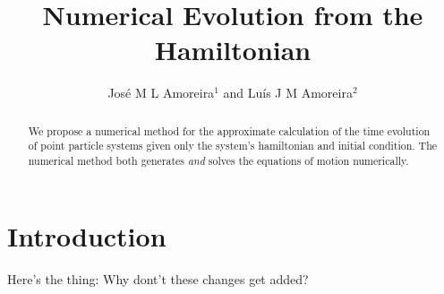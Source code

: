 \documentclass{iopart}
\begin{document}
\title{Numerical Evolution from the Hamiltonian}
\author{José M L Amoreira$^1$ and Luís J M Amoreira$^2$}
\address{$^1$ Departamento de Física, Instituto Superior Técnico, Lisboa,
Portugal}
\address{$^2$ Departamento de Física, Universidade da Beira Interior, Covilhã,
Portugal}
\begin{abstract}
  We propose a numerical method for the approximate calculation of the time
  evolution of point particle systems given only the system's hamiltonian and
  initial condition. The numerical method both generates \emph{and} solves
  the equations of motion numerically. 
\end{abstract}
\submitto{\EJP}
\maketitle
\section{Introduction}
Here's the thing: Why dont't these changes get added?
\end{document}
